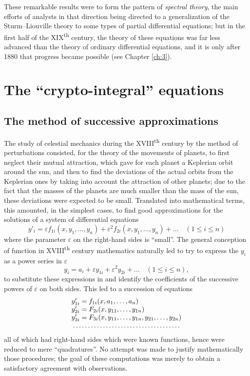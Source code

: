 \documentclass[12pt,a4paper,leqno,twoside]{extbook}
\newcommand{\supth}{\texorpdfstring{\textsuperscript{th}}{th}}
\begin{document}
These remarkable results were to form the pattern of \emph{spectral theory}, the main efforts of analysts in that direction being directed to a generalization of the Sturm--Liouville theory to some types of partial differential equations; but in the first half of the XIX\supth{} century, the theory of these equations was far less advanced than the theory of ordinary differential equations, and it is only after 1880 that progress became possible (see Chapter \ref{ch:3}).

\chapter{The ``crypto-integral'' equations}
\label{ch:2}
\setcounter{equation}{0}

\section{The method of successive approximations}
\label{sec:2.1}

The study of celestial mechanics during the XVIII\supth{} century by the method of perturbations consisted, for the theory of the movements of planets, to first neglect their mutual attraction, which gave for each planet a Keplerian orbit around the sun, and then to find the deviations of the actual orbits from the Keplerian ones by taking into account the attraction of other planets; due to the fact that the masses of the planets are much smaller than the mass of the sun, these deviations were expected to be small. Translated into mathematical terms, this amounted, in the simplest cases, to find good approximations for the solutions of a system of differential equations
\begin{equation}
    \label{eq:2.1}
    y'_i = \varepsilon f_{1i}(x, y_1, \ldots, y_n) + \varepsilon^2 f_{2i}(x, y_1, \ldots, y_n) + \ldots \quad (1 \leq i \leq n)
\end{equation}
where the parameter \(\varepsilon\) on the right-hand sides is ``small''. The general conception of function in XVIII\supth{} century mathematics naturally led to try to express the \(y_i\) as a power series in \(\varepsilon\)
\begin{equation}
    \label{eq:2.2}
    y_i = a_i + \varepsilon y_{1i} + \varepsilon^2 y_{2i} + \ldots \quad (1 \leq i \leq n),
\end{equation}
to substitute these expressions in and identify the coefficients of the successive powers of \(\varepsilon\) on both sides. This led to a succession of equations
\[
    \begin{array}{l}
        y'_{1i} = f_{1i}(x, a_1, \ldots, a_n) \\
        y'_{2i} = F_{2i}(x, y_{11}, \ldots, y_{1n}) \\
        y'_{3i} = F_{3i}(x, y_{11}, \ldots, y_{1n}, y_{21}, \ldots, y_{2n}) \\
        \dotfill
    \end{array}
\]
all of which had right-hand sides which were known functions, hence were reduced to mere ``quadratures''. No attempt was made to justify mathematically those procedures; the goal of these computations was merely to obtain a satisfactory agreement with observations.
\end{document}
